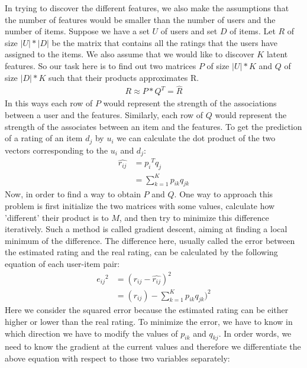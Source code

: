 In trying to discover the different features, we also make the assumptions that the number of features would be smaller than the number of users and the number of items. Suppose we have a set $U$ of users and set $D$ of items. Let $R$ of size $|U| * |D| $ be the matrix that contains all the ratings that the users have assigned to the items. We also assume that we would like to discover $K$ latent features. So our task here is to find out two matrices $P$ of size $|U| * K$ and $Q$ of size ${|D| * K}$ such that their products approximates R.
\begin{equation}
\begin{split}
	R \approx P*Q^T = \widehat{R}
\end{split}
\end{equation}
In this ways each row of $P$ would represent the strength of the associations between a user and the features. Similarly, each row of $Q$ would represent the strength of the associates between an item and the features. To get the prediction of a rating of an item $d_j$ by $u_i$ we can calculate the dot product of the two vectors corresponding to the $u_i$ and $d_j$:
\begin{equation}
\begin{split}
	\widehat{r_{ij}} & = {p_i}^Tq_j \\
	 & = {\sum_{k=1}^K} p_{ik}q_{jk}
\end{split}
\end{equation}
Now, in order to find a way to obtain $P$ and $Q$. One way to approach this problem is first initialize the two matrices with some values, calculate how 'different' their product is to $M$, and then try to minimize this difference iteratively. Such a method is called gradient descent, aiming at finding a local minimum of the difference. The difference here, usually called the error between the estimated rating and the real rating, can be calculated by the following equation of each user-item pair:
\begin{equation}
\begin{split}
	{e_{ij}}^2 & = (r_{ij} - \widehat{r_{ij}})^2 \\
	& = (r_{ij}) - {\sum_{k=1}^K} p_{ik}q_{jk})^2
\end{split}
\end{equation}
Here we consider the squared error because the estimated rating can be either higher or lower than the real rating.
To minimize the error, we have to know in which direction we have to modify the values of $p_{ik}$ and $q_{kj}$. In order words, we need to know the gradient at the current values and therefore we differentiate the above equation with respect to those two variables separately:
